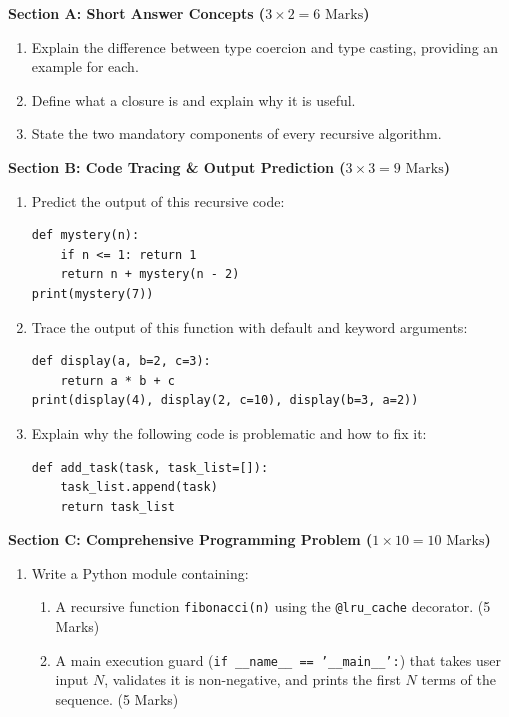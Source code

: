 \begin{chaptertest}
\noindent\textbf{Section A: Short Answer Concepts ($3 \times 2 = 6\text{ Marks}$)}
\begin{enumerate}
    \item Explain the difference between type coercion and type casting, providing an example for each.
    \item Define what a closure is and explain why it is useful.
    \item State the two mandatory components of every recursive algorithm.
\end{enumerate}

\medskip
\noindent\textbf{Section B: Code Tracing \& Output Prediction ($3 \times 3 = 9\text{ Marks}$)}
\begin{enumerate}[start=4]
    \item Predict the output of this recursive code:
    \begin{lstlisting}[language=Python3]
def mystery(n):
    if n <= 1: return 1
    return n + mystery(n - 2)
print(mystery(7))
    \end{lstlisting}
    \item Trace the output of this function with default and keyword arguments:
    \begin{lstlisting}[language=Python3]
def display(a, b=2, c=3):
    return a * b + c
print(display(4), display(2, c=10), display(b=3, a=2))
    \end{lstlisting}
    \item Explain why the following code is problematic and how to fix it:
    \begin{lstlisting}[language=Python3]
def add_task(task, task_list=[]):
    task_list.append(task)
    return task_list
    \end{lstlisting}
\end{enumerate}

\medskip
\noindent\textbf{Section C: Comprehensive Programming Problem ($1 \times 10 = 10\text{ Marks}$)}
\begin{enumerate}[start=7]
    \item Write a Python module containing:
    \begin{enumerate}[label=(\alph*)]
        \item A recursive function \texttt{fibonacci(n)} using the \texttt{@lru\_cache} decorator. (5 Marks)
        \item A main execution guard (\texttt{if \_\_name\_\_ == '\_\_main\_\_':}) that takes user input $N$, validates it is non-negative, and prints the first $N$ terms of the sequence. (5 Marks)
    \end{enumerate}
\end{enumerate}
\end{chaptertest}


